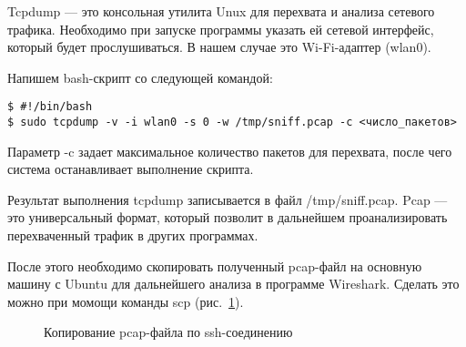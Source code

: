 Tcpdump --- это консольная утилита Unux для перехвата и анализа сетевого трафика. Необходимо при запуске программы указать ей сетевой интерфейс, который будет прослушиваться. В нашем случае это Wi-Fi-адаптер (wlan0).

Напишем bash-скрипт со следующей командой:

\begin{verbatim}
$ #!/bin/bash
$ sudo tcpdump -v -i wlan0 -s 0 -w /tmp/sniff.pcap -c <число_пакетов>
\end{verbatim}

Параметр -c задает максимальное количество пакетов для перехвата, после чего система останавливает выполнение скрипта.

Результат выполнения tcpdump записывается в файл /tmp/sniff.pcap. Pcap --- это универсальный формат, который позволит в дальнейшем проанализировать перехваченный трафик в других программах.

После этого необходимо скопировать полученный pcap-файл на основную машину с Ubuntu для дальнейшего анализа в программе Wireshark. Сделать это можно при момощи команды scp (рис.~\ref{tcpdump_1:tcpdump_1}).

\begin{figure}[h!]
\caption{ Копирование pcap-файла по ssh-соединению }
\label{tcpdump_1:tcpdump_1}
\end{figure}

\clearpage



